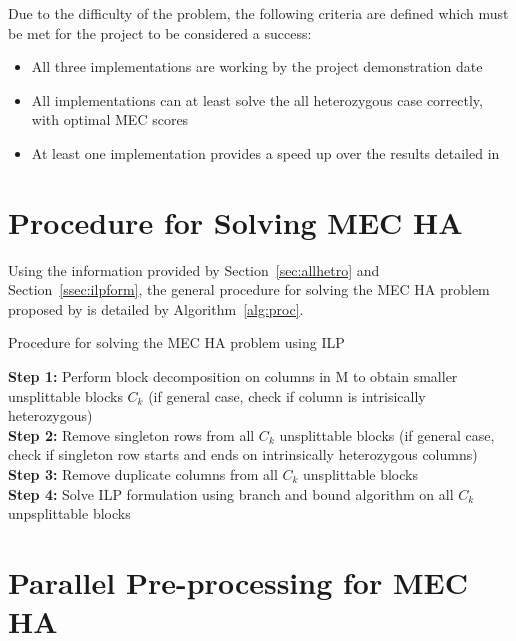 \documentclass[10pt,a4paer,twocolumn]{article}
\begin{document}
Due to the difficulty of the problem, the following criteria are defined which must be met for the project to
be considered a success:
\begin{itemize}[noitemsep]
    \item{All three implementations are working by the project demonstration date}
    \item{All implementations can at least solve the all heterozygous case correctly, with optimal MEC scores}
    \item{At least one implementation provides a speed up over the results detailed in \cite{chen:2013} }
\end{itemize}


\section{Procedure for Solving MEC HA}

Using the information provided by Section~\ref{sec:allhetro} and Section~\ref{ssec:ilpform}, the general
procedure for solving the MEC HA problem proposed by \cite{chen:2013} is detailed by Algorithm~\ref{alg:proc}.
\begin{algorithm}[h!]
    \small
    \caption{Procedure for solving the MEC HA problem using ILP}
    \label{alg:proc}
\textbf{Step 1:} Perform block decomposition on columns in M to obtain smaller unsplittable blocks $C_k$ (if 
general case, check if column is intrisically heterozygous)                                                       \\
\textbf{Step 2:} Remove singleton rows from all $C_k$ unsplittable blocks (if general case, check 
if singleton row starts and ends on intrinsically heterozygous columns)                                          \\
\textbf{Step 3:} Remove duplicate columns from all $C_k$ unsplittable blocks 							        \\
\textbf{Step 4:} Solve ILP formulation using branch and bound algorithm on all $C_k$ unpsplittable blocks 
\end{algorithm}


\section{Parallel Pre-processing for MEC HA } \label{sec:parpre}
\end{document}
